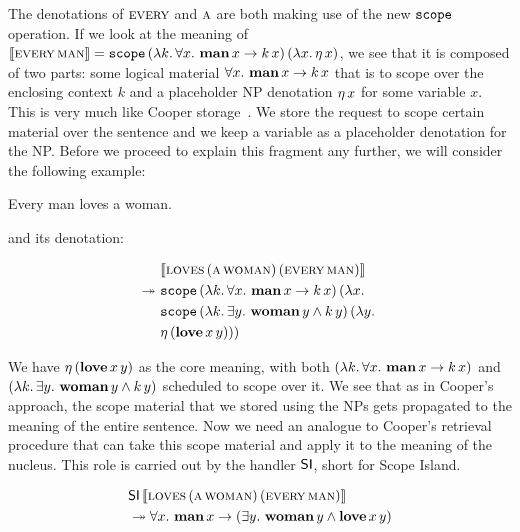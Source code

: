 The denotations of $\textsc{every}$ and $\textsc{a}$ are both making use of the
new $\mathtt{scope}$ operation. If we look at the meaning of
$\llbracket \textsc{every}\,\textsc{man} \rrbracket = \mathtt{scope}\,(\lambda k.\, \forall x.\
    \textbf{man}\,x \to k\,x)\,(\lambda x.\, \eta\,x)$, we see that
it is composed of two parts: some logical material
$\forall x.\ \textbf{man}\,x \to k\,x$ that is to scope over the
enclosing context $k$ and a placeholder NP denotation $\eta\,x$ for some
variable $x$. This is very much like Cooper
storage~\cite{cooper1979montague}. We store the request to scope certain
material over the sentence and we keep a variable as a placeholder
denotation for the NP. Before we proceed to explain this fragment any
further, we will consider the following example:

\begin{exe}
  \ex Every man loves a woman. \label{ex:quantifiers}
\end{exe}

and its denotation:

\NoChapterPrefix
\begin{align}
& \llbracket \textsc{loves}\,(\textsc{a}\,\textsc{woman})\,(\textsc{every}\,\textsc{man}) \rrbracket \nonumber \\
\twoheadrightarrow\ &\mathtt{scope}\,(\lambda k.\, \forall x.\ \textbf{man}\,x \to k\,x)\,(\lambda x.\,  \nonumber \\
      &\mathtt{scope}\,(\lambda k.\, \exists y.\ \textbf{woman}\,y \land k\,y)\,(\lambda y.\,  \nonumber \\
      &\eta\,(\textbf{love}\,x\,y)))
\end{align}
\ChapterPrefix

We have $\eta\,(\textbf{love}\,x\,y)$ as the core meaning, with both
$(\lam{k}{\forall x.\ \ap{\obj{man}}{x} \to \ap{k}{x}})$ and
$(\lambda k.\, \exists y.\ \textbf{woman}\,y \land k\,y)$ scheduled to
scope over it. We see that as in Cooper's approach, the scope material that
we stored using the NPs gets propagated to the meaning of the entire
sentence. Now we need an analogue to Cooper's retrieval procedure that can
take this scope material and apply it to the meaning of the nucleus. This
role is carried out by the handler $\textsf{SI}$, short for Scope Island.

\begin{align*}
& \ap{\SI}{\sem{\app{\abs{loves}}{(\ap{\abs{a}}{\abs{woman}})}{(\ap{\abs{every}}{\abs{man}})}}} \\
&\tto \forall x.\ \ap{\obj{man}}{x} \to (\exists y.\ \ap{\obj{woman}}{y} \land \app{\obj{love}}{x}{y})
\end{align*}

